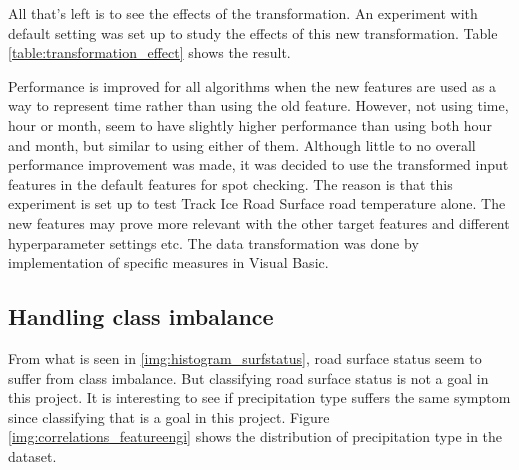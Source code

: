 	All that's left is to see the effects of the transformation. An experiment with default setting was set up to study the effects of this new transformation. Table \ref{table:transformation_effect} shows the result.

	\begin{table}[H]
	\centering
	\caption{Experiment to see the effects of transforming the time feature is relevant to use as input feature. }
	\end{table}

	Performance is improved for all algorithms when the new features are used as a way to represent time rather than using the old feature. However, not using time, hour or month, seem to have slightly higher performance than using both hour and month, but similar to using either of them. Although little to no overall performance improvement was made, it was decided to use the transformed input features in the default features for spot checking. The reason is that this experiment is set up to test Track Ice Road Surface road temperature alone. The new features may prove more relevant with the other target features and different hyperparameter settings etc. The data transformation was done by implementation of specific measures in Visual Basic.


\subsection{Handling class imbalance} \label{sec:class_imbalance}
	From what is seen in \ref{img:histogram_surfstatus}, road surface status seem to suffer from class imbalance. But classifying road surface status is not a goal in this project. It is interesting to see if precipitation type suffers the same symptom since classifying that is a goal in this project. Figure \ref{img:correlations_featureengi} shows the distribution of precipitation type in the dataset. 
	

